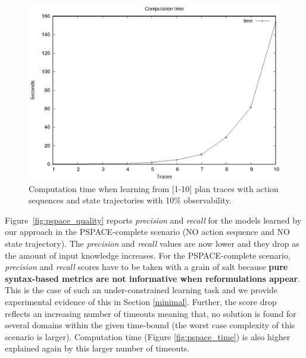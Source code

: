 \begin{figure}[hbt!]
	\centering
	\includegraphics[width=0.65\linewidth]{figures/input_size_100_10_time.eps}
	\caption{Computation time when learning from [1-10] plan traces with \FO action sequences and \PO state trajectories with 10\% observability.}
	\label{fig:np_time}
\end{figure}

\newpage
Figure~\ref{fig:pspace_quality} reports {\em precision} and {\em recall} for the models learned by our approach in the PSPACE-complete scenario (NO action sequence and NO state trajectory). The {\em precision} and {\em recall} values are now lower and they drop as the amount of input knowledge increases. For the PSPACE-complete scenario, {\em precision} and {\em recall} scores have to be taken with a grain of salt because {\bf pure syntax-based metrics are not informative when reformulations appear}. This is the case of such an under-constrained learning task and we provide experimental evidence of this in Section \ref{minimal}. Further, the score drop reflects an increasing number of timeouts meaning that, no solution is found for several domains within the given time-bound (the worst case complexity of this scenario is larger). Computation time (Figure \ref{fig:pspace_time}) is also higher explained again by this larger number of timeouts.


